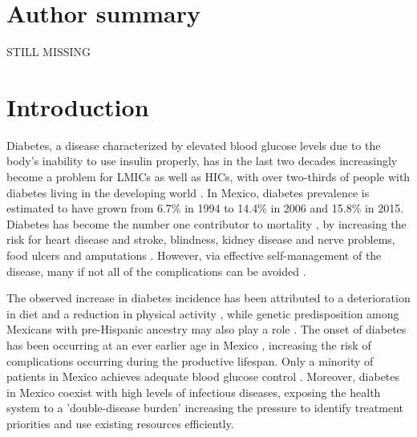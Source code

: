 \documentclass[10pt,letterpaper]{article}
\begin{document}
\section*{Author summary}
STILL MISSING


\section*{Introduction}
Diabetes, a disease characterized by elevated blood glucose levels due to the body's inability to use insulin properly, has in the last two decades increasingly become a problem for \acp{LMIC} as well as \acp{HIC}, with over two-thirds of people with diabetes living in the developing world \cite{InternationalDiabetesFederation2015}. In Mexico, diabetes prevalence is estimated to have grown from 6.7\% in 1994 to 14.4\% in 2006 \cite{Barquera2013} and 15.8\% in 2015. Diabetes has become the number one contributor to mortality \cite{InternationalDiabetesFederation2015}, by increasing the risk for heart disease and stroke, blindness, kidney disease and nerve problems, food ulcers and amputations \cite{Reynoso-Noveron2011}. However, via effective self-management of the disease, many if not all of the complications can be avoided \cite{Lim2011, Gregg2012}.

The observed increase in diabetes incidence has been attributed to a deterioration in diet and a reduction in physical activity \cite{Barquera2008b,Basu2013}, while genetic predisposition among Mexicans with pre-Hispanic ancestry may also play a role \cite{Williams2013}. The onset of diabetes has been occurring at an ever earlier age in Mexico \cite{Bello-Chavolla2017a}, increasing the risk of complications occurring during the productive lifespan. Only a minority of patients in Mexico achieves adequate blood glucose control \cite{Barquera2013}. Moreover, diabetes in Mexico coexist with high levels of infectious diseases, exposing the health system to a 'double-disease burden' increasing the pressure to identify treatment priorities and use existing resources efficiently\cite{Gutierrez-delgado2009}.
\end{document}
